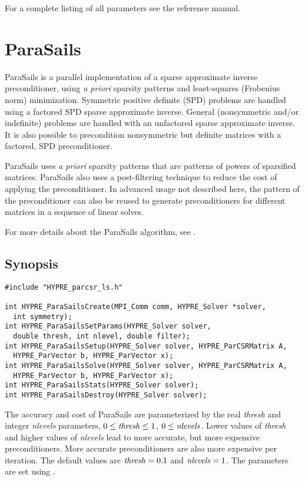 For a complete listing of all parameters see the reference manual.

\section{ParaSails}

ParaSails is a parallel implementation of a sparse approximate inverse
preconditioner, using {\em a priori} sparsity patterns and least-squares
(Frobenius norm) minimization.  Symmetric positive definite (SPD) problems
are handled using a factored SPD sparse approximate inverse.  General
(nonsymmetric and/or indefinite) problems are handled with an
unfactored sparse approximate inverse.  It is also possible to
precondition nonsymmetric but definite matrices with a factored, SPD
preconditioner.

ParaSails uses {\em a priori} sparsity patterns that are patterns of powers
of sparsified matrices.  ParaSails also uses a post-filtering technique
to reduce the cost of applying the preconditioner.  
In advanced usage not described here, the pattern of the
preconditioner can also be reused to generate preconditioners for different
matrices in a sequence of linear solves.

For more details about the ParaSails algorithm, see \cite{EChow_2000}.


\subsection{Synopsis}

\begin{display}
\begin{verbatim}
#include "HYPRE_parcsr_ls.h"

int HYPRE_ParaSailsCreate(MPI_Comm comm, HYPRE_Solver *solver, 
  int symmetry);
int HYPRE_ParaSailsSetParams(HYPRE_Solver solver, 
  double thresh, int nlevel, double filter);
int HYPRE_ParaSailsSetup(HYPRE_Solver solver, HYPRE_ParCSRMatrix A,
  HYPRE_ParVector b, HYPRE_ParVector x);
int HYPRE_ParaSailsSolve(HYPRE_Solver solver, HYPRE_ParCSRMatrix A,
  HYPRE_ParVector b, HYPRE_ParVector x);
int HYPRE_ParaSailsStats(HYPRE_Solver solver);
int HYPRE_ParaSailsDestroy(HYPRE_Solver solver);
\end{verbatim}
\end{display}

The accuracy and cost of ParaSails are parameterized by the real {\em thresh}
and integer {\em nlevels} parameters,
$0 \le {\it thresh} \le 1$, $0 \le {\it nlevels}$.
Lower values of {\em thresh}
and higher values of {\em nlevels} lead to more accurate, but more expensive
preconditioners.  More accurate preconditioners are also more expensive
per iteration.  The default values are ${\it thresh} = 0.1$
and ${\it nlevels} = 1$.  The parameters are set using
.


